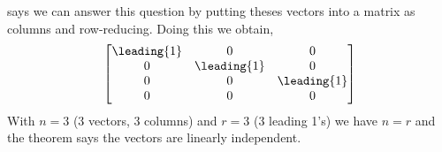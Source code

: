  says we can answer this question by putting theses vectors into a matrix as columns and row-reducing.  Doing this we obtain,
%
\begin{equation*}
\begin{bmatrix}
\leading{1} & 0 & 0\\
0 & \leading{1} & 0\\ 
0 & 0 & \leading{1}\\ 
0 & 0 & 0
\end{bmatrix}
\end{equation*}
%
With $n=3$ (3 vectors, 3 columns) and $r=3$ (3 leading 1's) we have $n=r$ and the theorem says the vectors are linearly independent.
